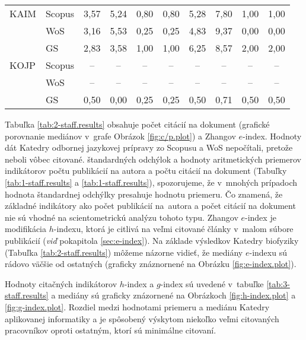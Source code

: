 \begin{table}
\begin{tabularx}{\textwidth}{XXcccc@{\hspace{3ex}}cccc}
    KAIM & Scopus & 3,57  & 5,24  & 0,80  & 0,80  & 5,28  & 7,80  & 1,00  & 1,00  \\
         & WoS    & 3,16  & 5,53  & 0,25  & 0,25  & 4,83  & 9,37  & 0,00  & 0,00  \\
         & GS     & 2,83  & 3,58  & 1,00  & 1,00  & 6,25  & 8,57  & 2,00  & 2,00  \\[1ex]
    KOJP & Scopus & --    & --    & --    & --    & --    & --    & --    & --    \\
         & WoS    & --    & --    & --    & --    & --    & --    & --    & --    \\
         & GS     & 0,50  & 0,00  & 0,25  & 0,25  & 0,50  & 0,71  & 0,50  & 0,50  \\
    \bottomrule
  \end{tabularx}
\end{table}

Tabuľka \ref{tab:2-staff.results} obsahuje počet citácií na dokument (grafické
porovnanie mediánov v~grafe Obrázok \ref{fig:c/p.plot}) a Zhangov $e$-index.
Hodnoty dát Katedry odbornej jazykovej prípravy zo Scopusu a WoS nepočítali,
pretože neboli vôbec citované.  štandardných odchýlok a hodnoty aritmetických
priemerov indikátorov počtu publikácií na autora a počtu citácií na dokument
(Tabuľky \ref{tab:1-staff.results} a \ref{tab:1-staff.results}), spozorujeme, že
v~mnohých prípadoch hodnota štandardnej odchýlky presahuje hodnotu priemeru.  Čo
znamená, že základné indikátory ako počet publikácií na~autora a počet citácií
na dokument nie sú vhodné na scientometrickú analýzu tohoto typu.  Zhangov
$e$-index je modifikácia $h$-indexu, ktorá je citlivá na veľmi citované články
v~malom súbore publikácií (\emph{viď} pokapitola \ref{sec:e-index}).  Na základe
výsledkov Katedry biofyziky (Tabuľka \ref{tab:2-staff.results}) môžeme názorne
vidieť, že mediány $e$-indexu sú rádovo väčšie od ostatných (graficky
znáznornené na Obrázku \ref{fig:e-index.plot}).

Hodnoty citačných indikátorov $h$-index a $g$-index sú uvedené v~tabuľke
\ref{tab:3-staff.results} a mediány sú graficky znázornené na Obrázkoch
\ref{fig:h-index.plot} a \ref{fig:g-index.plot}.  Rozdiel medzi hodnotami
priemeru a mediánu Katedry aplikovanej informatiky a je spôsobený výskytom
niekoľko veľmi citovaných pracovníkov oproti ostatným, ktorí sú minimálne
citovaní.

